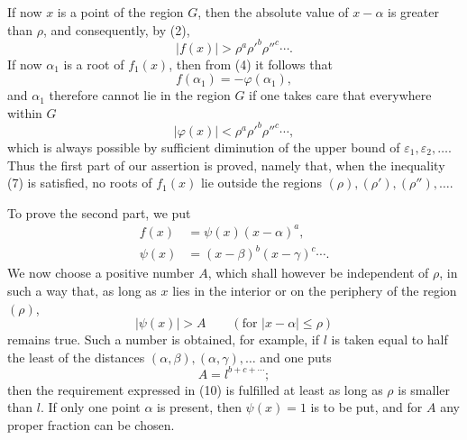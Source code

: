 \documentclass[11pt]{article}
\begin{document}
\begin{center}
\end{center}

If now $x$ is a point of the region $G$, then the absolute value of $x-\alpha$ is greater than $\rho$, and consequently, by (2),
\begin{equation}
 |f(x)|>\rho^a\rho'^b\rho''^c\cdots .
\tag{5}
\end{equation}
If now $\alpha_1$ is a root of $f_1(x)$, then from (4) it follows that
\begin{equation}
 f(\alpha_1)=-\varphi(\alpha_1),
\tag{6}
\end{equation}
and $\alpha_1$ therefore cannot lie in the region $G$ if one takes care that everywhere within $G$
\begin{equation}
 |\varphi(x)|<\rho^a\rho'^b\rho''^c\cdots,
\tag{7}
\end{equation}
which is always possible by sufficient diminution of the upper bound of $\varepsilon_1,\varepsilon_2,
\ldots$. Thus the first part of our assertion is proved, namely that, when the inequality (7) is satisfied, no roots of $f_1(x)$ lie outside the regions $(\rho),(\rho'),(\rho''),\ldots$.

To prove the second part, we put
\begin{align}
 f(x)&=\psi(x)(x-\alpha)^a,
\tag{8}\\
 \psi(x)&=(x-\beta)^b(x-\gamma)^c\cdots .
\tag{9}
\end{align}
We now choose a positive number $A$, which shall however be independent of $\rho$, in such a way that, as long as $x$ lies in the interior or on the periphery of the region $(\rho)$,
\begin{equation}
 |\psi(x)|>A \qquad (\text{for } |x-\alpha|\le \rho)
\tag{10}
\end{equation}
remains true. Such a number is obtained, for example, if $l$ is taken equal to half the least of the distances $(\alpha,\beta),(\alpha,\gamma),\ldots$ and one puts
\[
 A=l^{b+c+\cdots};
\]
then the requirement expressed in (10) is fulfilled at least as long as $\rho$ is smaller than $l$. If only one point $\alpha$ is present, then $\psi(x)=1$ is to be put, and for $A$ any proper fraction can be chosen.
\end{document}
